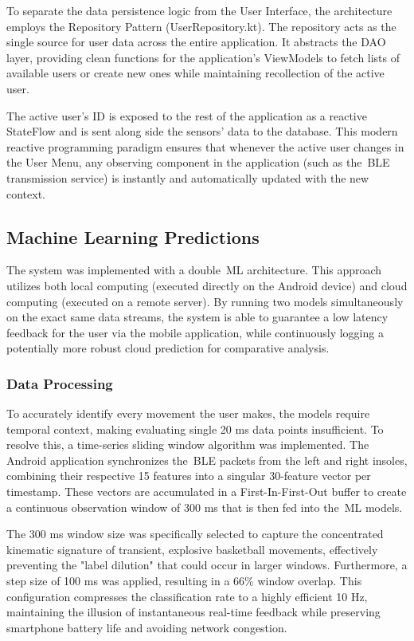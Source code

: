 To separate the data persistence logic from the User Interface, the architecture employs the Repository Pattern (UserRepository.kt). The repository acts as the single source for user data across the entire application.
It abstracts the DAO layer, providing clean functions for the application's ViewModels to fetch lists of available users or create new ones while maintaining recollection of the active user.

The active user's ID is exposed to the rest of the application as a reactive StateFlow and is sent along side the sensors' data to the database. This modern reactive programming paradigm ensures that whenever the active user changes in the 
User Menu, any observing component in the application (such as the~\gls{BLE} transmission service) is instantly and automatically updated with the new context.

\subsection{Machine Learning Predictions}
\label{ssec:ml_pred}

The system was implemented with a double~\gls{ML} architecture. This approach utilizes both local computing (executed directly on the Android device) and cloud computing (executed on a remote server). By running two models simultaneously on the exact same data 
streams, the system is able to guarantee a low latency feedback for the user via the mobile application, while continuously logging a potentially more robust cloud prediction for comparative analysis.


\subsubsection{Data Processing}
\label{sssec:ml_data}

To accurately identify every movement the user makes, the models require temporal context, making evaluating single 20 ms data points insufficient. To resolve this, a time-series sliding window algorithm was implemented. The Android application 
synchronizes the~\gls{BLE} packets from the left and right insoles, combining their respective 15 features into a singular 30-feature vector per timestamp. These vectors are accumulated in a First-In-First-Out buffer to create a 
continuous observation window of 300 ms that is then fed into the~\gls{ML} models.


The 300 ms window size was specifically selected to capture the concentrated kinematic signature of transient, explosive basketball movements, effectively preventing the "label dilution" that could occur in larger windows. Furthermore, a step 
size of 100 ms was applied, resulting in a 66\% window overlap. This configuration compresses the classification rate to a highly efficient 10 Hz, maintaining the illusion of instantaneous real-time feedback while preserving smartphone battery 
life and avoiding network congestion.

